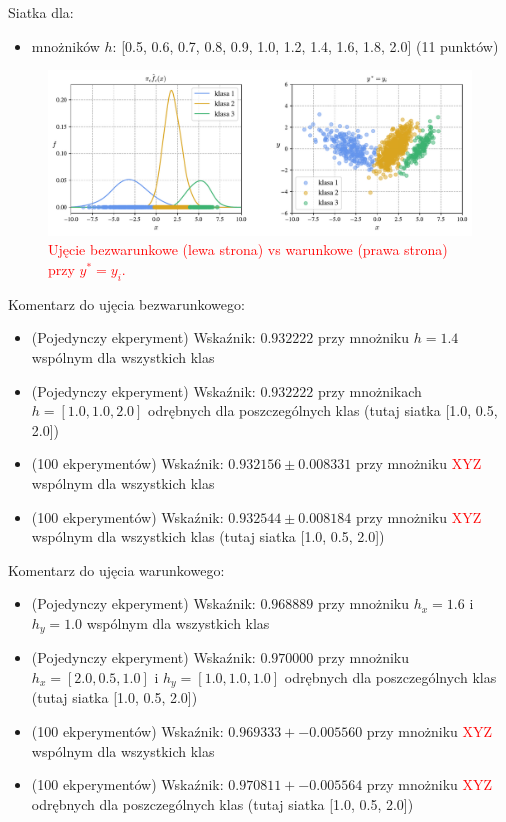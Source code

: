 \documentclass[12pt,a4paper,oneside]{book}
\theoremstyle{definition}
\begin{document}
Siatka dla:
\begin{itemize}
\item mnożników $h$: [0.5, 0.6, 0.7, 0.8, 0.9, 1.0, 1.2, 1.4, 1.6, 1.8, 2.0] (11 punktów)
\end{itemize} 
\begin{figure}[H]
    \centering
    \includegraphics[scale=0.6]{synthetic_data_classification_kde_and_ckde2}
    \vspace{-0.5cm} 
    \caption{\textcolor{red}{Ujęcie bezwarunkowe (lewa strona) vs warunkowe (prawa strona) przy $y^*=y_i$.}}
    \label{fig:synthetic_data_classification_kde_and_ckde2}
\end{figure}
Komentarz do ujęcia bezwarunkowego:
\begin{itemize}
\item (Pojedynczy ekperyment) Wskaźnik: $0.932222$ przy mnożniku $h=1.4$ wspólnym dla wszystkich klas
\item (Pojedynczy ekperyment) Wskaźnik: $0.932222$ przy mnożnikach $h=[1.0, 1.0, 2.0]$ odrębnych dla poszczególnych klas (tutaj siatka [1.0, 0.5, 2.0])
\item (100 ekperymentów) Wskaźnik: $0.932156 \pm 0.008331$ przy mnożniku \textcolor{red}{XYZ} wspólnym dla wszystkich klas
\item (100 ekperymentów) Wskaźnik: $0.932544 \pm 0.008184$ przy mnożniku \textcolor{red}{XYZ} wspólnym dla wszystkich klas (tutaj siatka [1.0, 0.5, 2.0])
\end{itemize}
Komentarz do ujęcia warunkowego:
\begin{itemize}
\item (Pojedynczy ekperyment) Wskaźnik: $0.968889$ przy mnożniku $h_x=1.6$ i $h_y=1.0$ wspólnym dla wszystkich klas
\item (Pojedynczy ekperyment) Wskaźnik: $0.970000$ przy mnożniku $h_x=[2.0, 0.5, 1.0]$ i $h_y=[1.0, 1.0, 1.0]$ odrębnych dla poszczególnych klas (tutaj siatka [1.0, 0.5, 2.0])
\item (100 ekperymentów) Wskaźnik: $0.969333 +- 0.005560$ przy mnożniku \textcolor{red}{XYZ} wspólnym dla wszystkich klas
\item (100 ekperymentów) Wskaźnik: $0.970811 +- 0.005564$ przy mnożniku \textcolor{red}{XYZ} odrębnych dla poszczególnych klas (tutaj siatka [1.0, 0.5, 2.0])
\end{itemize}
\end{document}
